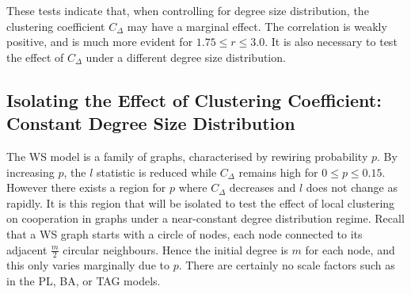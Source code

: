 \FloatBarrier
{}
\FloatBarrier
{} \FloatBarrier

These tests indicate that, when controlling for degree size distribution, the clustering coefficient $C_\Delta$ may have a marginal effect. The correlation is weakly positive, and is much more evident for $1.75\leq r\leq 3.0$. It is also necessary to test the effect of $C_\Delta$ under a different degree size distribution. \\

\subsection{Isolating the Effect of Clustering Coefficient: Constant Degree Size Distribution}
The WS model is a family of graphs, characterised by rewiring probability $p$. By increasing $p$, the $l$ statistic is reduced while $C_\Delta$ remains high for $0\leq p\leq0.15$. However there exists a region for $p$ where $C_\Delta$ decreases and $l$ does not change as rapidly. It is this region that will be isolated to test the effect of local clustering on cooperation in graphs under a near-constant degree distribution regime. Recall that a WS graph starts with a circle of nodes, each node connected to its adjacent $\frac{m}{2}$ circular neighbours. Hence the initial degree is $m$ for each node, and this only varies marginally due to $p$. There are certainly no scale factors such as in the PL, BA, or TAG models. \\

